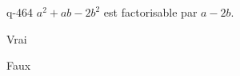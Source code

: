 \begin{truefalse}{q-464}
$a^2+ab-2b^2$ est factorisable par $a-2b$.
\item Vrai
\item* Faux
\end{truefalse}


